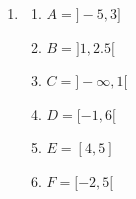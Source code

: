 \begin{enumerate}
    \item
          \begin{enumerate}
              \item \(A = ]-5,3]\)
              \item \(B = ]1,2.5[\)
              \item \(C = ]-\infty,1[\)
              \item \(D = [-1,6[\)
              \item \(E = [4,5]\)
              \item \(F = [-2,5[\)
          \end{enumerate}
\end{enumerate}

\clearpage



